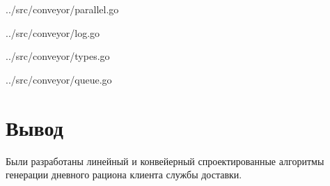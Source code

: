 \clearpage

\begin{lstinputlisting}[
	caption={Конвейерный алгоритм},
	label={lst:parallel},
	style={go},
	linerange={8-54},
	]{../src/conveyor/parallel.go}
\end{lstinputlisting}

\clearpage

\begin{lstinputlisting}[
	caption={Алгоритмы логирования},
	label={lst:log},
	style={go},
	linerange={8-46},
	]{../src/conveyor/log.go}
\end{lstinputlisting}

\clearpage

\begin{lstinputlisting}[
	caption={Используемые структуры данных},
	label={lst:structs},
	style={go},
	linerange={5-31},
	]{../src/conveyor/types.go}
\end{lstinputlisting}

\begin{lstinputlisting}[
	caption={Алгоритмы обработки очереди},
	label={lst:queue},
	style={go},
	linerange={5-17},
	]{../src/conveyor/queue.go}
\end{lstinputlisting}
\clearpage



\captionsetup{singlelinecheck = false, justification=centering}

\section{Вывод}

Были разработаны линейный и конвейерный спроектированные алгоритмы генерации дневного рациона клиента службы доставки.

